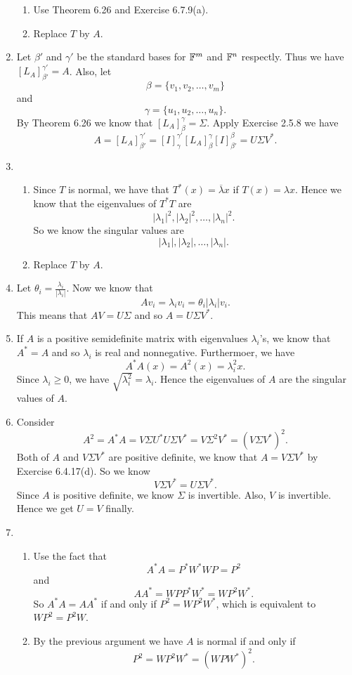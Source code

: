 \begin{enumerate}
\begin{enumerate}
\item Use Theorem 6.26 and Exercise 6.7.9(a).
\item Replace $T$ by $A$.
\end{enumerate}
\item Let $\beta'$ and $\gamma'$ be the standard bases for $\mathbb{F}^m$ and $\mathbb{F}^n$ respectly. Thus we have $[L_A]_{\beta'}^{\gamma'}=A$. Also, let 
\[\beta =\{v_1,v_2,\ldots ,v_m\}\]
and 
\[\gamma =\{u_1,u_2,\ldots ,u_n\}.\]
By Theorem 6.26 we know that $[L_A]_{\beta}^{\gamma}=\Sigma$. Apply Exercise 2.5.8 we have 
\[A=[L_A]_{\beta'}^{\gamma'}=[I]_{\gamma}^{\gamma'}[L_A]_{\beta}^{\gamma}[I]_{\beta'}^{\beta}=U\Sigma V^*.\]
\item \begin{enumerate}
\item Since $T$ is normal, we have that $T^*(x)=\overline{\lambda}x$ if $T(x)=\lambda x$. Hence we know that the eigenvalues of $T^*T$ are 
\[|\lambda_1|^2,|\lambda_2|^2,\ldots ,|\lambda_n|^2.\]
So we know the singular values are 
\[|\lambda_1|,|\lambda_2|,\ldots ,|\lambda_n|.\]
\item Replace $T$ by $A$.
\end{enumerate}
\item Let $\theta_i=\frac{\lambda_i}{|\lambda_i|}$. Now we know that 
\[Av_i=\lambda_iv_i=\theta_i |\lambda_i|v_i.\]
This means that $AV=U\Sigma $ and so $A=U\Sigma V^*$.
\item If $A$ is a positive semidefinite matrix with eigenvalues $\lambda_i$'s, we know that $A^*=A$ and so $\lambda_i$ is real and nonnegative. Furthermoer, we have 
\[A^*A(x)=A^2(x)=\lambda_i^2x.\]
Since $\lambda_i\geq 0$, we have $\sqrt{\lambda_i^2}=\lambda_i$. Hence the eigenvalues of $A$ are the singular values of $A$.
\item Consider 
\[A^2=A^*A=V\Sigma U^*U\Sigma V^*=V\Sigma^2V^*=(V\Sigma V^*)^2.\]
Both of $A$ and $V\Sigma V^*$ are positive definite, we know that $A=V\Sigma V^*$ by Exercise 6.4.17(d). So we know 
\[V\Sigma V^*=U\Sigma V^*.\]
Since $A$ is positive definite, we know $\Sigma $ is invertible. Also, $V$ is invertible. Hence we get $U=V$ finally.
\item \begin{enumerate}
\item Use the fact that 
\[A^*A=P^*W^*WP=P^2\]
and 
\[AA^*=WPP^*W^*=WP^2W^*.\]
So $A^*A=AA^*$ if and only if $P^2=WP^2W^*$, which is equivalent to $WP^2=P^2W$.
\item By the previous argument we have $A$ is normal if and only if 
\[P^2=WP^2W^*=(WPW^*)^2.\]

\end{enumerate}
\end{enumerate}
